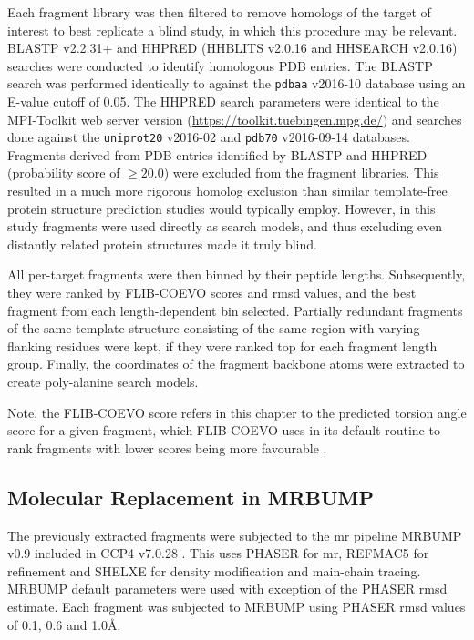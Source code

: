 Each fragment library was then filtered to remove homologs of the target of interest to best replicate a blind study, in which this procedure may be relevant. BLASTP v2.2.31+ \cite{Altschul1990-og,Camacho2009-th} and HHPRED (HHBLITS v2.0.16 and HHSEARCH v2.0.16) \cite{Soding2005-sx} searches were conducted to identify homologous PDB entries. The BLASTP search was performed identically to \textcite{De_Oliveira2018-za} against the \texttt{pdbaa} v2016-10 database using an E-value cutoff of 0.05. The HHPRED search parameters were identical to the MPI-Toolkit \cite{Biegert2006-cb} web server version (\url{https://toolkit.tuebingen.mpg.de/}) and searches done against the \texttt{uniprot20} v2016-02 and \texttt{pdb70} v2016-09-14 databases. Fragments derived from PDB entries identified by BLASTP and HHPRED (probability score of $\geq20.0$) were excluded from the fragment libraries. This resulted in a much more rigorous homolog exclusion than similar template-free protein structure prediction studies would typically employ. However, in this study fragments were used directly as search models, and thus excluding even distantly related protein structures made it truly blind.

All per-target fragments were then binned by their peptide lengths. Subsequently, they were ranked by FLIB-COEVO scores and \gls{rmsd} values, and the best fragment from each length-dependent bin selected. Partially redundant fragments of the same template structure consisting of the same region with varying flanking residues were kept, if they were ranked top for each fragment length group. Finally, the coordinates of the fragment backbone atoms were extracted to create poly-alanine search models.

Note, the FLIB-COEVO score refers in this chapter to the predicted torsion angle score for a given fragment, which FLIB-COEVO uses in its default routine to rank fragments with lower scores being more favourable \cite{De_Oliveira2015-kb,De_Oliveira2018-za}. 

\subsection{Molecular Replacement in MRBUMP}
The previously extracted fragments were subjected to the \gls{mr} pipeline MRBUMP v0.9 included in CCP4 v7.0.28 \cite{Keegan2018-kn}. This uses PHASER \cite{McCoy2007-mp} for \gls{mr}, REFMAC5 \cite{Murshudov2011-ww} for refinement and SHELXE \cite{Thorn2013-le} for density modification and main-chain tracing. MRBUMP default parameters were used with exception of the PHASER \gls{rmsd} estimate. Each fragment was subjected to MRBUMP using PHASER \gls{rmsd} values of 0.1, 0.6 and 1.0\AA.


